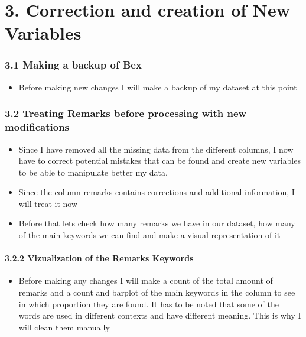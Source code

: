 \documentclass[
]{article}
\providecommand{\tightlist}{%
  \setlength{\itemsep}{0pt}\setlength{\parskip}{0pt}}
\begin{document}
\hypertarget{correction-and-creation-of-new-variables}{%
\section{3. Correction and creation of New
Variables}\label{correction-and-creation-of-new-variables}}

\hypertarget{making-a-backup-of-bex}{%
\subsubsection{3.1 Making a backup of
Bex}\label{making-a-backup-of-bex}}

\begin{itemize}
\tightlist
\item
  Before making new changes I will make a backup of my dataset at this
  point
\end{itemize}

\hypertarget{treating-remarks-before-processing-with-new-modifications}{%
\subsubsection{3.2 Treating Remarks before processing with new
modifications}\label{treating-remarks-before-processing-with-new-modifications}}

\begin{itemize}
\item
  Since I have removed all the missing data from the different columns,
  I now have to correct potential mistakes that can be found and create
  new variables to be able to manipulate better my data.
\item
  Since the column remarks contains corrections and additional
  information, I will treat it now
\item
  Before that lets check how many remarks we have in our dataset, how
  many of the main keywords we can find and make a visual representation
  of it
\end{itemize}

\hypertarget{vizualization-of-the-remarks-keywords}{%
\paragraph{3.2.2 Vizualization of the Remarks
Keywords}\label{vizualization-of-the-remarks-keywords}}

\begin{itemize}
\tightlist
\item
  Before making any changes I will make a count of the total amount of
  remarks and a count and barplot of the main keywords in the column to
  see in which proportion they are found. It has to be noted that some
  of the words are used in different contexts and have different
  meaning. This is why I will clean them manually
\end{itemize}
\end{document}

